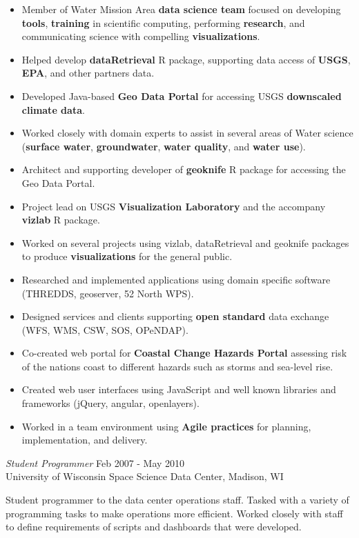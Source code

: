 \documentclass[line,margin]{res}
\begin{document}
\begin{resume}
	     \begin{itemize} \itemsep -2pt %
		\item Member of Water Mission Area \textbf{data science team} focused on developing \textbf{tools}, \textbf{training} in scientific computing, performing \textbf{research}, and communicating science with compelling \textbf{visualizations}.
		\item Helped develop \textbf{dataRetrieval} R package, supporting data access of \textbf{USGS}, \textbf{EPA}, and other partners data.
		\item Developed Java-based \textbf{Geo Data Portal} for accessing USGS \textbf{downscaled climate data}.
		\item Worked closely with domain experts to assist in several areas of Water science (\textbf{surface water}, \textbf{groundwater}, \textbf{water quality}, and \textbf{water use}).
		\item Architect and supporting developer of \textbf{geoknife} R package for accessing the Geo Data Portal.
		\item Project lead on USGS \textbf{Visualization Laboratory} and the accompany \textbf{vizlab} R package.
		\item Worked on several projects using vizlab, dataRetrieval and geoknife packages to produce \textbf{visualizations} for the general public.
		\item Researched and implemented applications using domain specific software (THREDDS, geoserver, 52 North WPS).
		\item Designed services and clients supporting \textbf{open standard} data exchange (WFS, WMS, CSW, SOS, OPeNDAP).
		\item Co-created web portal for \textbf{Coastal Change Hazards Portal} assessing risk of the nations coast to different hazards such as storms and sea-level rise.
		\item Created web user interfaces using JavaScript and well known libraries and frameworks (jQuery, angular, openlayers).
		\item Worked in a team environment using \textbf{Agile practices} for planning, implementation, and delivery.
	     \end{itemize}
		{\sl Student Programmer} \hfill Feb 2007 - May 2010 \\
		University of Wisconsin Space Science Data Center, Madison, WI
                
		Student programmer to the data center operations staff.  Tasked with a variety of programming tasks to make operations more efficient.  Worked closely with staff to define requirements of scripts and dashboards that were developed.


\end{resume}
\end{document}
